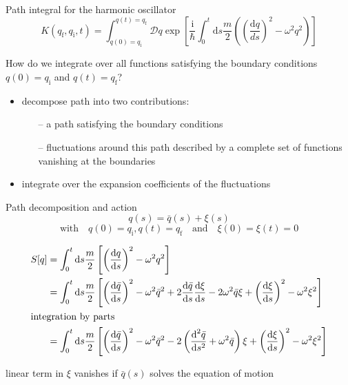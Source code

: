 \documentclass[t,dvipsnames]{beamer}
\begin{document}
\begin{frame}[c]{Path integral for the harmonic oscillator}
 \begin{displaymath}
  K(q_\text{f}, q_\text{i}, t) = \int_{q(0)=q_\text{i}}^{q(t)=q_\text{f}}
    \mathcal{D}q\exp\left[\frac{\text{i}}{\hbar}\int_0^t\text{d}s
	 \frac{m}{2}\left(\left(\frac{\text{d}q}{ds}\right)^2-\omega^2q^2\right)\right]
 \end{displaymath}

 \vspace{0.5truecm}
 How do we integrate over all functions satisfying the boundary conditions
 $q(0)=q_\text{i}$ and $q(t)=q_\text{f}$?

 \begin{itemize}
  \item decompose path into two contributions:
	\begin{itemize}
         \item[--] a path satisfying the boundary conditions
         \item[--] fluctuations around this path described by a complete
		   set of functions vanishing at the boundaries
	\end{itemize}
  \item integrate over the expansion coefficients of the fluctuations
 \end{itemize}
\end{frame}

\begin{frame}[t]{Path decomposition and action}
 \vspace{-0.3truecm}
 \begin{displaymath}
  q(s) = \bar q(s) + \xi(s)
 \end{displaymath}
 \begin{displaymath}
  \text{with}\quad q(0)=q_\text{i}, q(t)=q_\text{f}\quad\text{and}\quad \xi(0)=\xi(t)=0
 \end{displaymath}
 \begin{small}
  \begin{align}
   S[q] &= \int_0^t\text{d}s\frac{m}{2}\left[\left(\frac{\text{d}q}{\text{d}s}\right)^2
 	   -\omega^2q^2\right]\nonumber\\
        &= \int_0^t\text{d}s\frac{m}{2}\left[\left(\frac{\text{d}\bar q}{\text{d}s}\right)^2
           -\omega^2\bar q^2+2\frac{\text{d}\bar q}{\text{d}s}\frac{\text{d}\xi}{\text{d}s}
           -2\omega^2\bar q\xi+\left(\frac{\text{d}\xi}{\text{d}s}\right)^2-\omega^2\xi^2\right]
	   \nonumber\\
   \intertext{integration by parts}
        &= \int_0^t\text{d}s\frac{m}{2}\left[\left(\frac{\text{d}\bar q}{\text{d}s}\right)^2
           -\omega^2\bar q^2-2\left(\frac{\text{d}^2\bar q}{\text{d}s^2}+\omega^2\bar q\right)\xi
           +\left(\frac{\text{d}\xi}{\text{d}s}\right)^2-\omega^2\xi^2\right]\nonumber
  \end{align}
 \end{small}
 linear term in $\xi$ vanishes if $\bar q(s)$ solves the equation of motion
\end{frame}
\end{document}
